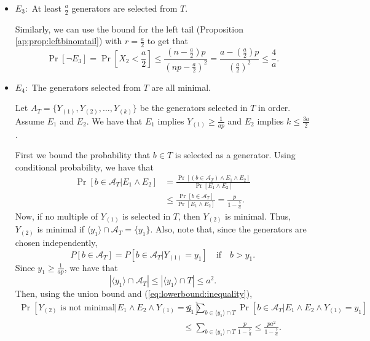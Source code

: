 \begin{itemize}
    \item $E_3:$ At least $\frac{a}{2}$ generators are selected from $T$. \par 
    Similarly, we can use the bound for the left tail (Proposition \ref{ap:prop:leftbinomtail}) with $r = \frac{a}{2}$ to get that
    \begin{equation}\label{eq:lowerbound:e3}
        \Pr[ \lnot E_3] = \Pr\left[X_2 < \frac{a}{2}\right] \leq  \frac{(n - \frac{a}{2})p}{(np - \frac{a}{2})^2} = \frac{a - (\frac{a}{2})p}{(\frac{a}{2})^2} \leq \frac{4}{a}.
    \end{equation}
    \item $E_4:$ The generators selected from $T$ are all minimal.\par 
    Let $A_T = \{Y_{(1)}, Y_{(2)}, \ldots, Y_{(k)}\}$ be the generators selected in $T$ in order. Assume $E_1$ and $E_2$. We have that $E_1$ implies $Y_{(1)} \geq \frac{1}{ap}$ and $E_2$ implies $k \leq \frac{3a}{2}$. \par
    First we bound the probability that $b \in T$ is selected as a generator. Using conditional probability, we have that 
    \begin{align}
        \Pr[b \in \mathcal{A}_T|E_1 \land E_2] &= \frac{\Pr[(b \in \mathcal{A}_T)\land E_1 \land E_2]}{\Pr[E_1 \land E_2]} \\
        &\leq\frac{\Pr[b \in \mathcal{A}_T]}{\Pr[E_1 \land E_2]} = \frac{p}{1 - \frac{7}{a}}. \label{eq:lowerbound:inequality}
    \end{align}
    Now, if no multiple of $Y_{(1)}$ is selected in $T$, then $Y_{(2)}$ is minimal. Thus, $Y_{(2)}$ is minimal if $\langle y_1 \rangle \cap  \mathcal{A}_T = \{y_1\}$. Also, note that, since the generators are chosen independently,
    \[P[b \in \mathcal{A}_T] = P[b \in \mathcal{A}_T|Y_{(1)} = y_1] \quad \text{if} \quad  b > y_1.\]
    Since $y_1 \geq \frac{1}{ap}$, we have that \[|\langle y_1 \rangle \cap  \mathcal{A}_T| \leq |\langle y_1 \rangle \cap T| \leq a^2.\] Then, using the union bound and (\ref{eq:lowerbound:inequality}),
    \begin{align*}
        \Pr[Y_{(2)} \text{ is not minimal}|E_1\land E_2 \land Y_{(1)} = y_1]&\leq \sum_{b \in\langle y_1\rangle \cap T}\Pr[b \in \mathcal{A}_T|E_1 \land E_2 \land Y_{(1)} = y_1]\\ 
        &\leq \sum_{b \in\langle y_1\rangle \cap T} \frac{p}{1 - \frac{7}{a}} \leq \frac{pa^2}{1 - \frac{7}{a}}.
    \end{align*}
        

\end{itemize}
